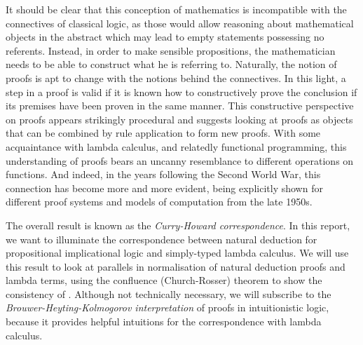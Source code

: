 It should be clear that this conception of mathematics is incompatible with the
connectives of classical logic, as those would allow reasoning about
mathematical objects in the abstract which may lead to empty statements
possessing no referents. Instead, in order to make sensible propositions, the
mathematician needs to be able to construct what he is referring to. Naturally,
the notion of proofs is apt to change with the notions behind the connectives.
In this light, a step in a proof is valid if it is known how to constructively
prove the conclusion if its premises have been proven in the same manner. This
constructive perspective on proofs appears strikingly procedural and suggests
looking at proofs as objects that can be combined by rule application to form
new proofs. With some acquaintance with lambda calculus, and relatedly functional
programming, this understanding of proofs bears an uncanny resemblance to
different operations on functions. And indeed, in the years following the Second
World War, this connection has become more and more evident, being explicitly
shown for different proof systems and models of computation from the late 1950s.

The overall result is known as the \textit{Curry-Howard correspondence}. In this
report, we want to illuminate the correspondence between natural deduction for
propositional implicational logic and simply-typed lambda calculus. We will use
this result to look at parallels in normalisation of natural deduction proofs
and lambda terms, using the confluence (Church-Rosser) theorem to show the
consistency of \implnpi. Although not technically necessary, we will subscribe
to the \textit{Brouwer-Heyting-Kolmogorov interpretation} of proofs in
intuitionistic logic, because it provides helpful intuitions for the
correspondence with lambda calculus.
